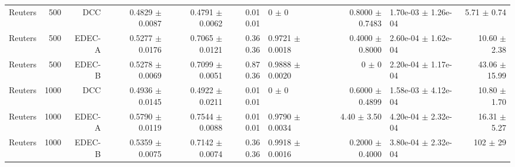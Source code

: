 \begin{table}[ht]
{\begin{tabular}{ | r | r | r | r | r | r | H  r | H  r |}
Reuters & 500 & DCC & 0.4829 $\pm$ 0.0087 & 0.4791 $\pm$ 0.0062 & { \color{black}0.01} { \color{black}0.01} & 0 $\pm$ 0 & 0.8000 $\pm$ 0.7483 & 1.70e-03 $\pm$ 1.26e-04 & 5.71 $\pm$ 0.74 \\ 
Reuters & 500 & EDEC-A & { \color{blue} 0.5277 $\pm$ 0.0176} & { \color{blue} 0.7065 $\pm$ 0.0121} & { \color{black}0.36} { \color{black}0.36} & 0.9721 $\pm$ 0.0018 & 0.4000 $\pm$ 0.8000 & 2.60e-04 $\pm$ 1.62e-04 & 10.60 $\pm$ 2.38 \\ 
Reuters & 500 & EDEC-B & { \color{green} 0.5278 $\pm$ 0.0069} & { \color{green} 0.7099 $\pm$ 0.0051} & { \color{black}0.87} { \color{black}0.36} & 0.9888 $\pm$ 0.0020 & 0 $\pm$ 0 & 2.20e-04 $\pm$ 1.17e-04 & 43.06 $\pm$ 15.99 \\ \hline 
Reuters & 1000 & DCC & 0.4936 $\pm$ 0.0145 & 0.4922 $\pm$ 0.0211 & { \color{black}0.01} { \color{black}0.01} & 0 $\pm$ 0 & 0.6000 $\pm$ 0.4899 & 1.58e-03 $\pm$ 4.12e-04 & 10.80 $\pm$ 1.70 \\ 
Reuters & 1000 & EDEC-A & { \color{green} 0.5790 $\pm$ 0.0119} & { \color{green} 0.7544 $\pm$ 0.0088} & { \color{green} 0.01} { \color{green} 0.01} & 0.9790 $\pm$ 0.0034 & 4.40 $\pm$ 3.50 & 4.20e-04 $\pm$ 2.32e-04 & 16.31 $\pm$ 5.27 \\ 
Reuters & 1000 & EDEC-B & 0.5359 $\pm$ 0.0075 & 0.7142 $\pm$ 0.0074 & { \color{green} 0.36} { \color{green} 0.36} & 0.9918 $\pm$ 0.0016 & 0.2000 $\pm$ 0.4000 & 3.80e-04 $\pm$ 2.32e-04 & 102 $\pm$ 29 \\ 
\hline
\end{tabular}
}
\end{table}